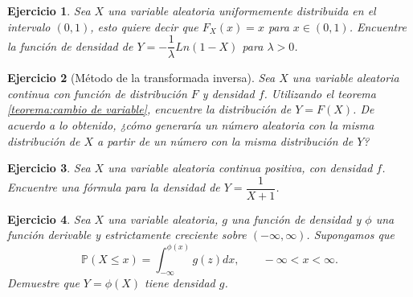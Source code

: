\documentclass[11pt]{report}
\theoremstyle{break}
\newtheorem{ejercicio}{Ejercicio}[chapter]
\theoremstyle{break}
\begin{document}
\begin{ejercicio}
Sea $X$ una variable aleatoria uniformemente distribuida en el intervalo $(0,1)$, esto quiere decir que $F_X(x) = x$ para $x \in (0,1)$. Encuentre la función de densidad de $Y = - \dfrac{1}{\lambda} Ln (1 - X)$ para $\lambda > 0$.
\end{ejercicio}

\begin{ejercicio}[Método de la transformada inversa]
Sea $X$ una variable aleatoria continua con función de distribución $F$ y densidad $f$. Utilizando el teorema \ref{teorema:cambio de variable}, encuentre la distribución de $Y = F(X)$.
De acuerdo a lo obtenido, ¿cómo generaría un número aleatoria con la misma distribución de $X$ a partir de un número con la misma distribución de $Y$?
\end{ejercicio}

\begin{ejercicio}
Sea $X$ una variable aleatoria continua positiva, con densidad $f$. Encuentre una fórmula para la densidad de $Y = \dfrac{1}{X + 1}$.
\end{ejercicio}

\begin{ejercicio}
Sea $X$ una variable aleatoria, $g$ una función de densidad y $\phi$ una función derivable y estrictamente creciente sobre $(-\infty, \infty)$. Supongamos que
$$
\mathbb{P}(X \leq x) = \int_{-\infty}^{\phi(x)} g(z)dx, \qquad -\infty < x <\infty.
$$
Demuestre que $Y = \phi(X)$ tiene densidad $g$.
\end{ejercicio}
\end{document}
